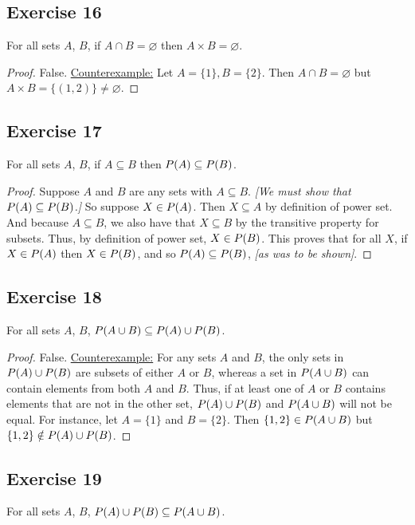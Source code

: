 \documentclass[14pt]{extarticle}
\let\mathscr\relax
\newcommand{\ps}{\mathscr{P}}
\newcommand{\es}{\varnothing}
\begin{document}
\subsection{Exercise 16}
For all sets $A$, $B$, if \(A \cap B = \es\) then \(A \times B = \es\).

\begin{proof}
False. \underline{Counterexample:} Let \(A = \{1\}, B = \{2\}\). 
Then \(A \cap B = \es\) but \(A \times B = \{(1, 2)\} \neq \es\).
\end{proof}

\subsection{Exercise 17}
For all sets $A$, $B$, if \(A \subseteq B\) then \(\ps(A) \subseteq \ps(B)\).

\begin{proof}
Suppose $A$ and $B$ are any sets with \(A \subseteq B\). {\it [We must show that \(\ps(A) \subseteq \ps(B)\).]} 
So suppose \(X \in \ps(A)\). Then \(X \subseteq A\) by definition of power set. And because \(A \subseteq B\), 
we also have that \(X \subseteq B\) by the transitive property for subsets. Thus, by definition of power set, 
\(X \in \ps(B)\). This proves that for all $X$, if \(X \in \ps(A)\) then \(X \in \ps(B)\), and so 
\(\ps(A) \subseteq \ps(B)\), {\it [as was to be shown]}.
\end{proof}

\subsection{Exercise 18}
For all sets $A$, $B$, \(\ps(A \cup B) \subseteq \ps(A) \cup \ps(B)\).

\begin{proof}
False. \underline{Counterexample:} For any sets $A$ and $B$, the only sets in \(\ps(A) \cup \ps(B)\) are subsets of 
either $A$ or $B$, whereas a set in \(\ps(A \cup B)\) can contain elements from both $A$ and $B$. Thus, if at least 
one of $A$ or $B$ contains elements that are not in the other set, \(\ps(A) \cup \ps(B)\) and \(\ps(A \cup B)\) 
will not be equal. For instance, let \(A = \{1\}\) and \(B = \{2\}\). Then \(\{1, 2\} \in \ps(A \cup B)\) but 
\(\{1, 2\} \notin \ps(A) \cup \ps(B)\).
\end{proof}

\subsection{Exercise 19}
For all sets $A$, $B$, \(\ps(A) \cup \ps(B) \subseteq \ps(A \cup B)\).
\end{document}
